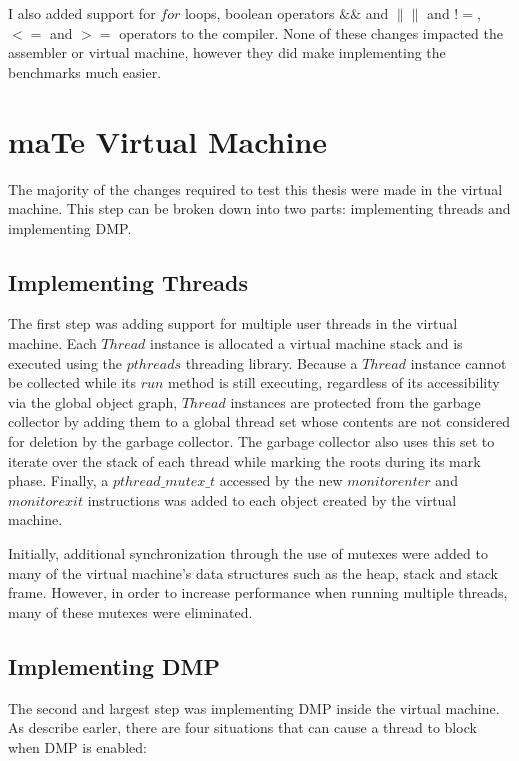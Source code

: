 I also added support for $for$ loops, boolean operators $\&\&$ and
$\|\|$ and $!=$, $<=$ and $>=$ operators to the compiler.  None of
these changes impacted the assembler or virtual machine, however they
did make implementing the benchmarks much easier.

\section{maTe Virtual Machine}

The majority of the changes required to test this thesis were made in
the virtual machine.  This step can be broken down into two parts:
implementing threads and implementing DMP.

\subsection{Implementing Threads}

The first step was adding support for multiple user threads in the
virtual machine.  Each $Thread$ instance is allocated a virtual
machine stack and is executed using the $pthreads$ threading library.
Because a $Thread$ instance cannot be collected while its $run$ method
is still executing, regardless of its accessibility via the global
object graph, $Thread$ instances are protected from the garbage
collector by adding them to a global thread set whose contents are not
considered for deletion by the garbage collector.  The garbage
collector also uses this set to iterate over the stack of each thread
while marking the roots during its mark phase.  Finally, a
$pthread\_mutex\_t$ accessed by the new $monitorenter$ and
$monitorexit$ instructions was added to each object created by the
virtual machine.

Initially, additional synchronization through the use of mutexes were
added to many of the virtual machine's data structures such as the
heap, stack and stack frame.  However, in order to increase
performance when running multiple threads, many of these mutexes were
eliminated.

\subsection{Implementing DMP}

The second and largest step was implementing DMP inside the virtual
machine.  As describe earler, there are four situations that can cause
a thread to block when DMP is enabled:

